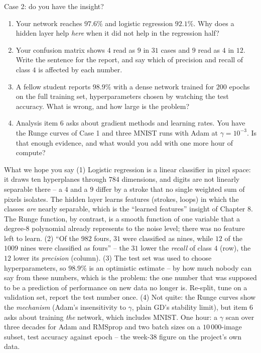 \documentclass[10pt,aspectratio=169]{beamer}
\newcounter{insight}
\newcounter{case}
\begin{document}
\begin{frame}{Case 2: do you have the insight?}
\scriptsize
\begin{enumerate}
  \item Your network reaches $97.6\%$ and logistic regression $92.1\%$.  Why
        does a hidden layer help \emph{here} when it did not help in the
        regression half?
  \item Your confusion matrix shows $4$ read as $9$ in $31$ cases and $9$
        read as $4$ in $12$.  Write the sentence for the report, and say
        which of precision and recall of class $4$ is affected by each
        number.
  \item A fellow student reports $98.9\%$ with a dense network trained for
        $200$ epochs on the full training set, hyperparameters chosen by
        watching the test accuracy.  What is wrong, and how large is the
        problem?
  \item Analysis item 6 asks about gradient methods and learning rates.  You
        have the Runge curves of Case 1 and three MNIST runs with Adam at
        $\gamma=10^{-3}$.  Is that enough evidence, and what would you add
        with one more hour of compute?
\end{enumerate}
\pause
\begin{block}{What we hope you say}
\scriptsize
(1) Logistic regression is a linear classifier in pixel space: it draws ten
hyperplanes through $784$ dimensions, and digits are not linearly
separable there -- a $4$ and a $9$ differ by a stroke that no single
weighted sum of pixels isolates.  The hidden layer learns features (strokes,
loops) in which the classes \emph{are} nearly separable, which is the
``learned features'' insight of Chapter 8.  The Runge function, by contrast,
is a smooth function of one variable that a degree-8 polynomial already
represents to the noise level; there was no feature left to learn.  (2)
``Of the $982$ fours, $31$ were classified as nines, while $12$ of the
$1009$ nines were classified as fours'' -- the $31$ lower the \emph{recall}
of class $4$ (row), the $12$ lower its \emph{precision} (column).  (3) The
test set was used to choose hyperparameters, so $98.9\%$ is an optimistic
estimate -- by how much nobody can say from these numbers, which is the
problem: the one number that was supposed to be a prediction of performance
on new data no longer is.  Re-split, tune on a validation set, report the
test number once.  (4) Not quite: the Runge curves show the \emph{mechanism}
(Adam's insensitivity to $\gamma$, plain GD's stability limit), but item 6
asks about training \emph{the} network, which includes MNIST.  One hour: a
$\gamma$ scan over three decades for Adam and RMSprop and two batch sizes on
a $10\,000$-image subset, test accuracy against epoch -- the week-38 figure
on the project's own data.
\end{block}
\end{frame}
\end{document}
